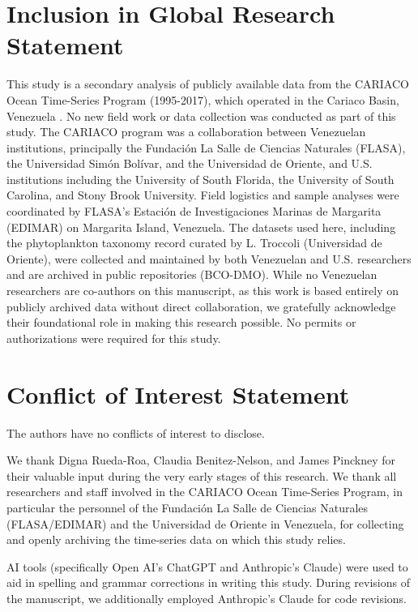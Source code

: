 \documentclass[]{agujournal2019}
\begin{document}
\section*{Inclusion in Global Research Statement}
This study is a secondary analysis of publicly available data from the CARIACO Ocean Time-Series Program (1995-2017), which operated in the Cariaco Basin, Venezuela \cite{muller-karger_scientific_2019}. No new field work or data collection was conducted as part of this study. The CARIACO program was a collaboration between Venezuelan institutions, principally the Fundaci\'{o}n La Salle de Ciencias Naturales (FLASA), the Universidad Sim\'{o}n Bol\'{i}var, and the Universidad de Oriente, and U.S. institutions including the University of South Florida, the University of South Carolina, and Stony Brook University. Field logistics and sample analyses were coordinated by FLASA's Estaci\'{o}n de Investigaciones Marinas de Margarita (EDIMAR) on Margarita Island, Venezuela. The datasets used here, including the phytoplankton taxonomy record curated by L. Troccoli (Universidad de Oriente), were collected and maintained by both Venezuelan and U.S. researchers and are archived in public repositories (BCO-DMO). While no Venezuelan researchers are co-authors on this manuscript, as 
this work is based entirely on publicly archived data without direct 
collaboration, we gratefully acknowledge their foundational role in 
making this research possible. No permits or authorizations were required for this study.

\section*{Conflict of Interest Statement}
The authors have no conflicts of interest to disclose.

\acknowledgments
We thank Digna Rueda-Roa, Claudia Benitez-Nelson, and James Pinckney 
for their valuable input during the very early stages of this research. 
We thank all researchers and staff involved in the CARIACO Ocean 
Time-Series Program, in particular the personnel of the 
Fundaci\'{o}n La Salle de Ciencias Naturales (FLASA/EDIMAR) and the 
Universidad de Oriente in Venezuela, for collecting and openly 
archiving the time-series data on which this study relies.

AI tools (specifically Open AI's ChatGPT and Anthropic's Claude) were 
used to aid in spelling and grammar corrections in writing this study. 
During revisions of the manuscript, we additionally employed Anthropic's 
Claude for code revisions.
\end{document}

